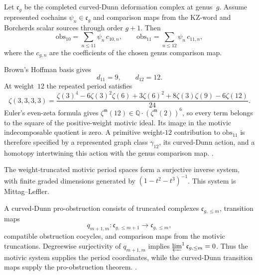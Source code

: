 \begin{remark}
\label{rem:cdhg-obs-10-11}
Let \(\mathfrak c_g\) be the completed curved-Dunn deformation complex
at genus~\(g\).  Assume represented cochains
\(\psi_n\in\mathfrak c_g\) and comparison maps from the KZ-word and
Borcherds scalar sources through order \(g+1\).  Then
\[
 \mathrm{obs}_{10}
 =
 \sum_{n\leq11}\psi_n\,c_{10,n},
 \qquad
 \mathrm{obs}_{11}
 =
 \sum_{n\leq12}\psi_n\,c_{11,n},
\]
where the \(c_{g,n}\) are the coefficients of the chosen genus
comparison map.

Brown's Hoffman basis gives
\[
 d_{11}=9,\qquad d_{12}=12.
\]
At weight~$12$ the repeated period satisfies
\begin{equation}
\label{eq:cdhg-zeta3333-newton}
 \zeta(3,3,3,3)
 =
 \frac{\zeta(3)^4-6\zeta(3)^2\zeta(6)+3\zeta(6)^2
 +8\zeta(3)\zeta(9)-6\zeta(12)}{24}.
\end{equation}
Euler's even-zeta formula gives
$\zeta^{\mathfrak m}(12)\in
\mathbb Q\cdot(\zeta^{\mathfrak m}(2))^6$, so every term belongs to
the square of the positive-weight motivic ideal.  Its image in the
motivic indecomposable quotient is zero.  A
primitive weight-$12$ contribution to \(\mathrm{obs}_{11}\) is
therefore specified by a represented graph class \(\gamma_{12}\), its
curved-Dunn action, and a homotopy intertwining this action with the
genus comparison map.
\cite{Brown2011,Brown2012,Hoffman1997}.
\end{remark}

\begin{remark}
\label{rem:cdhg-ML-12}
The weight-truncated motivic period spaces form a surjective inverse
system, with finite graded dimensions generated by
\((1-t^2-t^3)^{-1}\).  This system is Mittag--Leffler.

A curved-Dunn pro-obstruction consists of truncated complexes
\(\mathfrak c_{g,\leq m}\), transition maps
\[
 q_{m+1,m}\colon\mathfrak c_{g,\leq m+1}
 \longrightarrow\mathfrak c_{g,\leq m},
\]
compatible obstruction cocycles, and comparison maps from the
motivic truncations.  Degreewise surjectivity of \(q_{m+1,m}\)
implies \(\varprojlim^1\mathfrak c_{g,\leq m}=0\).
Thus the motivic system supplies the period coordinates, while the
curved-Dunn transition maps supply the pro-obstruction theorem.
\cite{Brown2011}.
\end{remark}

